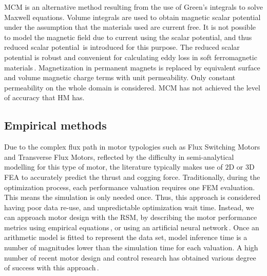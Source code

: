         
        \ac{MCM} is an alternative method resulting from the use of Green’s integrals to solve Maxwell equations. Volume integrals are used to obtain magnetic scalar potential under the assumption that the materials used are current free. It is not possible to model the magnetic field due to current using the scalar potential, and thus reduced scalar potential\,\cite{Gong2009AnalysisMethod} is introduced for this purpose. The reduced scalar potential is robust and convenient for calculating eddy loss in soft ferromagnetic materials\,\cite{Xu2004TotalCalculation,Bowler1987EddyFunctions,Rubinacci2004AComputation}. Magnetization in permanent magnets is replaced by equivalent surface and volume magnetic charge terms with unit permeability. Only constant permeability on the whole domain is considered. \acs{MCM} has not achieved the level of accuracy that \acs{HM} has.
        
    
    \subsection{Empirical methods}                  \label{Chapter:background/modelling techniques for designing motors/empirical methods}


        Due to the complex flux path in motor typologies such as Flux Switching Motors and Transverse Flux Motors, reflected by the difficulty in semi-analytical modelling for this type of motor, the literature typically makes use of $\mathrm{2D}$ or $\mathrm{3D}$ \acs{FEA} to accurately predict the thrust and cogging force. Traditionally, during the optimization process, each performance valuation requires one FEM evaluation. This means the simulation is only needed once. Thus, this approach is considered having poor data re-use, and unpredictable optimization wait time. Instead, we can approach motor design with the \acf{RSM}, by describing the motor performance metrics using empirical equations\,\cite{Hong2008,Lei2013}, or using an artificial neural network\,\cite{Hadjout2006,Ashabani2010OptimumApproach}. Once an arithmetic model is fitted to represent the data set, model inference time is a number of magnitudes lower than the simulation time for each valuation. A high number of recent motor design and control research has obtained various degree of success with this approach\,\cite{Hwang2007RotorMethod,Lee2012OptimumMethod,Kim2006OptimalMethodology,Jung2015AdaptiveDrives,Hong2018DesignApplications}. 
        
